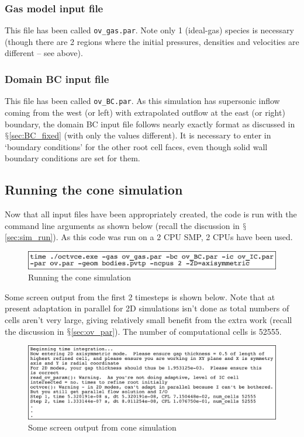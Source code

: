 \documentclass[pdftex, 12pt, a4paper]{report}
\begin{document}
\subsubsection{Gas model input file}

This file has been called \verb'ov_gas.par'.  Note only 1 (ideal-gas) species is necessary (though there are 2 regions where the initial 
pressures, densities and velocities are different -- see above).

\subsubsection{Domain BC input file}

This file has been called \verb'ov_BC.par'.
As this simulation has supersonic inflow coming from the west (or left) with extrapolated outflow at the east (or right) boundary,
the domain BC input file follows nearly exactly format as discussed in $\mathsection$\ref{sec:BC_fixed} (with only the values different).
It is necessary to enter in `boundary conditions' for the other root cell faces, even though solid wall boundary conditions
are set for them.  

\subsection{Running the cone simulation}\label{sec:cone_run}

Now that all input files have been appropriately created, the code is run with the command line arguments as shown below (recall
the discussion in $\mathsection$\ref{sec:sim_run}).  As this code was run on a 2 CPU SMP, 2 CPUs have been used.

\begin{figure}[htp]
\centering
\includegraphics[width=14cm]{pics/cmd_exe_cone.jpg}
\caption{Running the cone simulation}
\label{fig:cone_run}
\end{figure}

Some screen output from the first 2 timesteps is shown below.  Note that at present adaptation in parallel for 2D simulations
isn't done as total numbers of cells aren't very large, giving relatively small benefit from the extra work (recall the discussion
in $\mathsection$\ref{sec:ov_par}).  The number of computational cells is 52555.

\begin{figure}[htp]
\centering
\includegraphics[width=16cm]{pics/cone_output.jpg}
\caption{Some screen output from cone simulation}
\label{fig:cone_output}
\end{figure}
\end{document}
